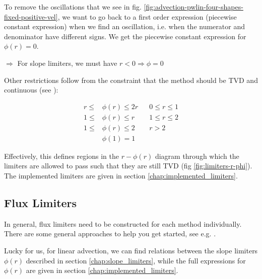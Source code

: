To remove the oscillations that we see in fig. \ref{fig:advection-pwlin-four-shapes-fixed-positive-vel}, we want to go back to a first order expression (piecewise constant expression) when we find an oscillation, i.e. when the numerator and denominator have different signs.
We get the piecewise constant expression for $\phi(r) = 0$.

$\Rightarrow$ For slope limiters, we must have $r < 0 \Rightarrow \phi = 0$


Other restrictions follow from the constraint that the method should be TVD and continuous (see \cite{swebyHighResolutionSchemes1984}):

\begin{align}
	r \le& \phi(r) \le 2r 	&&	 0  \le r \le 1 \label{eq:TVD-consequence-first}\\
	1 \le& \phi(r) \le r 	&&	 1 \le r \le 2 \\
	1 \le& \phi(r) \le 2 	&&	 r > 2 \\
	& \phi(1) = 1 &&  \label{eq:TVD-consequence-last}
\end{align}



Effectively, this defines regions in the $r-\phi(r)$ diagram through which the limiters are allowed to pass such that they are still TVD (fig \ref{fig:limiters-r-phi}).
The implemented limiters are given in section \ref{chap:implemented_limiters}.




















\subsection{Flux Limiters}






In general, flux limiters need to be constructed for each method individually.
There are some general approaches to help you get started, see e.g. \cite{toro}.

Lucky for us, for linear advection, we can find relations between the slope limiters $\phi(r)$ described in section \ref{chap:slope_limiters}, while the full expressions for $\phi(r)$ are given in section \ref{chap:implemented_limiters}.





